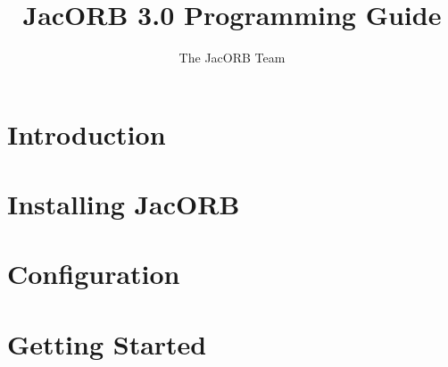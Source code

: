 \documentclass[12pt]{scrbook}
\title{JacORB 3.0 Programming Guide}
\author{The JacORB Team}
\begin{document}
\newcommand{\cmdline}[1]{\begin{small}\noindent \texttt{\$ #1}\end{small}}

\newcommand{\JacORBDir}{JacORB3\_0}
\newcommand{\JacORBVersion}{3.0}
\maketitle

\setlength{\parskip}{1.1ex}
\newpage
\tableofcontents


\chapter{Introduction}
\label{ch:intro}




\chapter{Installing JacORB}
\label{ch:installing}




\chapter{Configuration}
\label{ch:configuration}




\chapter{Getting Started}
\label{ch:start}



\end{document}

